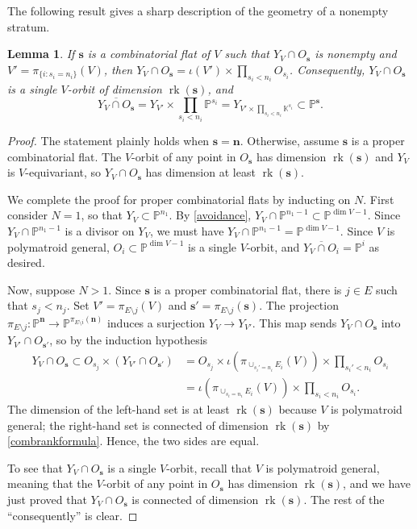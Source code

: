 \documentclass[11pt]{article}
\newtheorem{lemm}[theo]{Lemma}
\theoremstyle{definition}
\numberwithin{equation}{section}
\renewcommand{\P}{\mathbb{P}}
\newcommand{\K}{\mathbb{K}}
\DeclareMathOperator{\rk}{rk}
\begin{document}
The following result gives a sharp description of the geometry of a nonempty stratum.
\begin{lemm}\label{strata}
  If $\mathbf s$ is a combinatorial flat of $V$ such that $Y_V \cap O_{\mathbf s}$ is nonempty and $V' = \pi_{\{i : s_i = n_i\}}(V)$, then
  $ Y_V \cap O_{\mathbf s} = \iota(V') \times \prod_{s_i < n_i} O_{s_i}$.
  Consequently, $Y_V \cap O_{\mathbf s}$ is a single $V$-orbit of dimension $\rk(\mathbf s)$, and
  \[ \textstyle \overline{Y_V \cap O_{\mathbf s}}  = Y_{V'} \times \prod_{s_i < n_i} \P^{s_i} = Y_{V' \times \prod_{s_i < n_i} \K^{s_i}} \subset \P^{\mathbf s}. \]
\end{lemm}
\begin{proof}
  The statement plainly holds when $\mathbf s = \mathbf n$.
  Otherwise, assume $\mathbf s$ is a proper combinatorial flat.
  The $V$-orbit of any point in $O_{\mathbf s}$ has dimension $\rk(\mathbf s)$ and $Y_V$ is $V$-equivariant, so $Y_V \cap O_{\mathbf s}$ has dimension at least $\rk(\mathbf s)$.
  
  We complete the proof for proper combinatorial flats by inducting on $N$.
  First consider $N = 1$, so that  $Y_V \subset \P^{n_1}$.
  By \cref{avoidance}, $Y_V \cap \P^{n_1 - 1} \subset \P^{\dim V - 1}$.
  Since $Y_V \cap \P^{n_1 - 1}$ is a divisor on $Y_V$, we must have $Y_V \cap \P^{n_1 - 1} = \P^{\dim V - 1}$.
  Since $V$ is polymatroid general, $O_i \subset \P^{\dim V - 1}$ is a single $V$-orbit, and $\overline{Y_V \cap O_i} = \P^{i}$ as desired.

  Now, suppose $N > 1$.
  Since $\mathbf s$ is a proper combinatorial flat, there is $j \in E$ such that $s_j < n_j$.
  Set $V' = \pi_{E \setminus j}(V)$ and $\mathbf s' = \pi_{E \setminus j}(\mathbf s)$.
  The projection $\pi_{E \setminus j}: \P^{\mathbf n} \to \P^{\pi_{E \setminus i}(\mathbf n)}$ induces a surjection $Y_V \to Y_{V'}$. This map sends $Y_V \cap O_{\mathbf s}$ into $Y_{V'} \cap O_{\mathbf s'}$, so by the induction hypothesis
  \begin{align*} 
  \textstyle Y_V \cap O_{\mathbf s} \subset O_{s_j} \times (Y_{V'} \cap O_{\mathbf s'})
    &= O_{s_j} \times \iota(\pi_{\cup_{s_i' = n_i} E_i}( V)) \times \prod_{s_i' < n_i} O_{s_i}\\
    &= \iota(\pi_{\cup_{s_i = n_i} E_i}( V)) \times \prod_{s_i < n_i} O_{s_i}.
  \end{align*}
  The dimension of the left-hand set is at least $\rk(\mathbf s)$ because $V$ is polymatroid general; the right-hand set is connected of dimension  $\rk(\mathbf s)$ by \cref{combrankformula}.
  Hence, the two sides are equal.

  To see that $Y_V \cap O_{\mathbf s}$ is a single $V$-orbit, recall that $V$ is polymatroid general, meaning that the $V$-orbit of any point in $O_{\mathbf s}$ has dimension $\rk(\mathbf s)$, and we have just proved that $Y_V \cap O_{\mathbf s}$ is connected of dimension $\rk(\mathbf s)$.
  The rest of the ``consequently'' is clear.
\end{proof}
\end{document}
